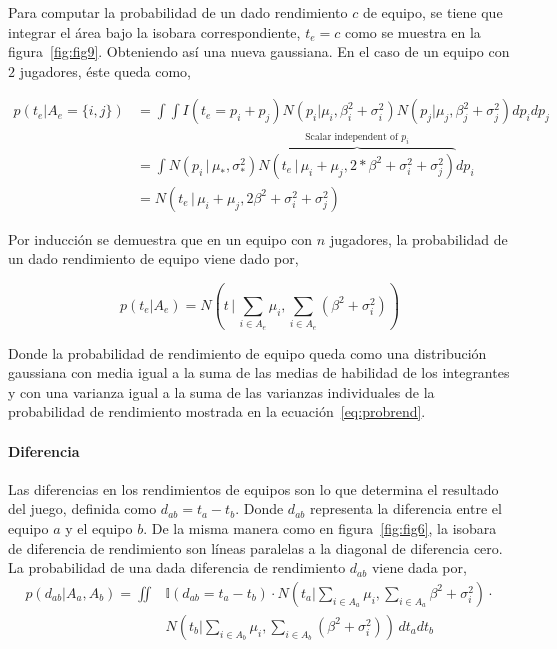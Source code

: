 \documentclass[11pt,twoside,spanish]{report} %
\begin{document}
Para computar la probabilidad de un dado rendimiento $c$ de equipo, se tiene que integrar el \'area bajo la isobara correspondiente, $ t_e = c $ como se muestra en la figura~\ref{fig:fig9}.
Obteniendo as\'i una nueva gaussiana.
En el caso de un equipo con $2$ jugadores, \'este queda como,


\begin{equation}
\begin{split}
p(t_e|A_e=\{i,j\}) & =\int\int I(t_e=p_i+p_j)N(p_i \vert \mu_i,\beta_i^2+\sigma_i^2)N(p_j \vert \mu_j,\beta_j^2+\sigma_j^2)dp_idp_j\\
  & = \int N(p_i\,|\,\mu_{*},\sigma_{*}^2) \overbrace{N(t_e\,|\,\mu_i+\mu_j,2*\beta^2 + \sigma_i^2 + \sigma_j^2)}^{\text{Scalar independent of $p_i$}} dp_i \\[0.3cm]
& = N(t_e \,|\, \mu_i+\mu_j,2\beta^2 + \sigma_i^2 + \sigma_j^2)
\end{split}
\end{equation}

Por inducci\'on se demuestra que en un equipo con $n$ jugadores, la probabilidad de un dado rendimiento de equipo viene dado por,

\begin{equation}
p(t_e|A_e) = N\left(t\,|\,\sum_{i\in A_e} \mu_i,\sum_{i\in A_e} (\beta^2 + \sigma_i^2)\right)
\end{equation}

Donde la probabilidad de rendimiento de equipo queda como una distribuci\'on gaussiana con media igual a la suma de las medias de habilidad de los integrantes y con una varianza igual a la suma de las varianzas individuales de la probabilidad de rendimiento mostrada en la ecuaci\'on~\ref{eq:probrend}.


\paragraph{Diferencia}

Las diferencias en los rendimientos de equipos son lo que determina el resultado del juego, definida como $d_{ab}=t_a - t_b$.
Donde $d_{ab}$ representa la diferencia entre el equipo $a$ y el equipo $b$.
De la misma manera como en figura~\ref{fig:fig6}, la isobara de diferencia de rendimiento son l\'ineas paralelas a la diagonal de diferencia cero.
La probabilidad de una dada diferencia de rendimiento $d_ {ab}$ viene dada por,
\begin{align}\label{eq:mensajeCum}
p(d_{ab}|A_a,A_b) = \iint & \mathbb{I}(d_{ab}=t_a -t_b)\cdot N(t_a|\sum_{i\in A_a} \mu_i,\sum_{i\in A_a} \beta^2 + \sigma_i^2) \cdot \nonumber \\
& N(t_b|\sum_{i\in A_b} \mu_i,\sum_{i\in A_b} (\beta^2 + \sigma_i^2)) \, dt_a dt_b
\end{align}
\end{document}
